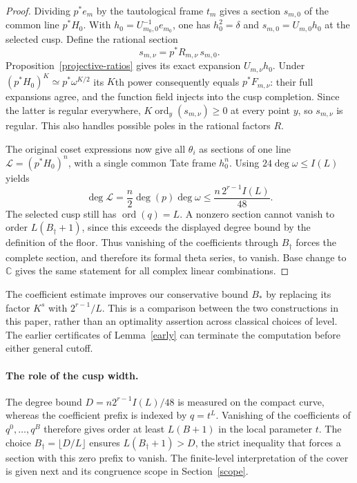 \documentclass[11pt]{article}
\theoremstyle{remark}\newtheorem{remark}[theorem]{Remark}
\newcommand{\C}{\mathbb C}\newcommand{\OO}{\mathcal O}
\DeclareMathOperator{\ord}{ord}\DeclareMathOperator{\diag}{diag}
\begin{document}
\begin{proof}
Dividing $p^*e_m$ by the tautological frame $t_m$ gives a section
$s_{m,0}$ of the common line $p^*H_0$. With
$h_0=U_{m_0,0}^{-1}e_{m_0}$, one has $h_0^2=\delta$ and
$s_{m,0}=U_{m,0}h_0$ at the selected cusp. Define the rational section
\[
 s_{m,\nu}=p^*R_{m,\nu}\,s_{m,0}.
\]
Proposition~\ref{projective-ratios} gives its exact expansion
$U_{m,\nu}h_0$. Under $(p^*H_0)^K\simeq p^*\omega^{K/2}$ its
$K$th power consequently equals $p^*F_{m,\nu}$: their full
expansions agree, and the function field injects into the cusp
completion. Since the latter is regular everywhere,
$K\ord_y(s_{m,\nu})\geq0$ at every point $y$, so $s_{m,\nu}$ is
regular. This also handles possible poles in the rational factors $R$.

The original coset expressions now give all $\theta_i$ as sections of
one line $\mathcal L=(p^*H_0)^n$, with a single common Tate frame
$h_0^n$. Using $24\deg\omega\leq I(L)$ yields
\[
 \deg\mathcal L=\frac n2\deg(p)\deg\omega
       \leq\frac{n\,2^{r-1}I(L)}{48}.
\]
The selected cusp still has $\ord(q)=L$. A nonzero section cannot
vanish to order $L(B_\dagger+1)$, since this exceeds the displayed
degree bound by the definition of the floor. Thus vanishing of the
coefficients through $B_\dagger$ forces the complete section, and
therefore its formal theta series, to vanish. Base change to $\C$
gives the same statement for all complex linear combinations.
\end{proof}

The coefficient estimate improves our conservative bound $B_*$ by replacing
its factor $K^s$ with $2^{r-1}/L$. This is a comparison between the two
constructions in this paper, rather than an optimality assertion across
classical choices of level. The earlier certificates of Lemma~\ref{early}
can terminate the computation before either general cutoff.

\paragraph{The role of the cusp width.}
The degree bound $D=n2^{r-1}I(L)/48$ is measured on the compact curve,
whereas the coefficient prefix is indexed by $q=t^L$. Vanishing of the
coefficients of $q^0,\ldots,q^B$ therefore gives order at least $L(B+1)$
in the local parameter $t$. The choice $B_\dagger=\lfloor D/L\rfloor$
ensures $L(B_\dagger+1)>D$, the strict inequality that forces a section
with this zero prefix to vanish. The finite-level interpretation of the
cover is given next and its congruence scope in Section~\ref{scope}.
\end{document}
